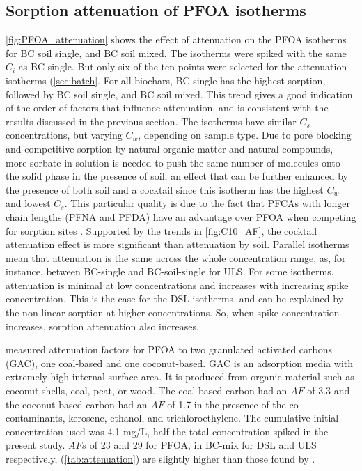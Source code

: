 \subsection{Sorption attenuation of PFOA isotherms}
\cref{fig:PFOA_attenuation} shows the effect of attenuation on the PFOA isotherms for BC soil single, and BC soil mixed. The isotherms were spiked with the same $C_i$ as BC single. But only six of the ten points were selected for the attenuation isotherms (\cref{sec:batch}. For all biochars, BC single has the highest sorption, followed by BC soil single, and BC soil mixed. This trend gives a good indication of the order of factors that influence attenuation, and is consistent with the results discussed in the previous section. The isotherms have similar $C_s$ concentrations, but varying $C_w$, depending on sample type. Due to pore blocking and competitive sorption by natural organic matter and natural compounds, more sorbate in solution is needed to push the same number of molecules onto the solid phase in the presence of soil, an effect that can be further enhanced by the presence of both soil and a cocktail since this isotherm has the highest $C_w$ and lowest $C_s$. This particular quality is due to the fact that PFCAs with longer chain lengths (PFNA and PFDA) have an advantage over PFOA when competing for sorption sites \citep{Sormo2021}. Supported by the trends in \cref{fig:C10_AF}, the cocktail attenuation effect is more significant than attenuation by soil. Parallel isotherms mean that attenuation is the same across the whole concentration range, as, for instance, between BC-single and BC-soil-single for ULS. For some isotherms, attenuation is minimal at low concentrations and increases with increasing spike concentration. This is the case for the DSL isotherms, and can be explained by the non-linear sorption at higher concentrations. So, when spike concentration increases, sorption attenuation also increases. 

\cite{siriwardena2019influence} measured attenuation factors for PFOA to two granulated activated carbons (GAC), one coal-based and one coconut-based. GAC is an adsorption media with extremely high internal surface area. It is produced from organic material such as coconut shells, coal, peat, or wood. The coal-based carbon had an $AF$ of 3.3 and the coconut-based carbon had an $AF$ of 1.7 in the presence of the co-contaminants, kerosene, ethanol, and trichloroethylene. The cumulative initial concentration used was 4.1 mg/L, half the total concentration spiked in the present study. $AFs$ of 23 and 29 for PFOA, in BC-mix for DSL and ULS respectively, (\cref{tab:attenuation}) are slightly higher than those found by \cite{siriwardena2019influence}. 

